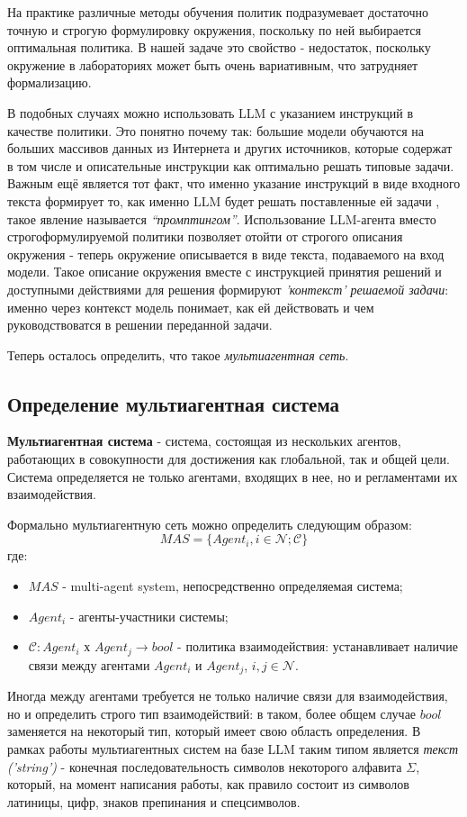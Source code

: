 На практике различные методы обучения политик подразумевает достаточно точную и
строгую формулировку окружения, поскольку по ней выбирается оптимальная политика. 
В нашей задаче это свойство - недостаток, поскольку окружение в лабораториях может 
быть очень вариативным, что затрудняет формализацию.

В подобных случаях можно использовать LLM с указанием инструкций в качестве политики. 
Это понятно почему так: большие модели обучаются на больших массивов данных из Интернета
и других источников, которые содержат в том числе и описательные инструкции как оптимально решать 
типовые задачи. 
Важным ещё является тот факт, что именно указание инструкций в виде входного текста 
формирует то, как именно LLM будет решать поставленные ей задачи 
\cite{plaandsolve, zeroshot-cot, tot}, такое явление называется \textit{``промптингом''}. 
Использование LLM-агента вместо строгоформулируемой политики позволяет отойти 
от строгого описания окружения - теперь окружение описывается в виде текста, 
подаваемого на вход модели. Такое описание окружения вместе с инструкцией принятия решений и 
доступными действиями для решения формируют \textit{'контекст' решаемой задачи}: 
именно через контекст модель понимает, как ей действовать и чем руководствоватся в решении 
переданной задачи. 

Теперь осталось определить, что такое \textit{мультиагентная сеть}.

\subsection{Определение мультиагентная система} \label{ch1:sec1:subsec2}

\textbf{Мультиагентная система} - система, состоящая из нескольких агентов, работающих 
в совокупности для достижения как глобальной, так и общей цели. Система определяется не 
только агентами, входящих в нее, но и регламентами их взаимодействия.

Формально мультиагентную сеть можно определить следующим образом:
\begin{equation}
    MAS = \{Agent_i, i\in\mathcal{N}; \mathcal{C}\} \label{eq2}
\end{equation}
где:
\begin{itemize}
    \item $MAS$ - multi-agent system, непосредственно определяемая система;
    \item $Agent_i$ - агенты-участники системы;
    \item $\mathcal{C}: Agent_i$ х $Agent_j \rightarrow bool$ - политика взаимодействия: 
устанавливает наличие связи между агентами $Agent_i$ и $Agent_j$, $i, j \in \mathcal{N}$.
\end{itemize}
Иногда между агентами требуется не только наличие связи для взаимодействия, но и определить
строго тип взаимодействий: в таком, более общем случае $bool$ заменяется на некоторый тип, 
который имеет свою область определения. 
В рамках работы мультиагентных систем на базе LLM таким типом является 
\textit{текст ('string')} - конечная последовательность символов некоторого алфавита $\Sigma$, 
который, на момент написания работы, как правило состоит из символов латиницы, цифр, знаков
препинания и спецсимволов.

